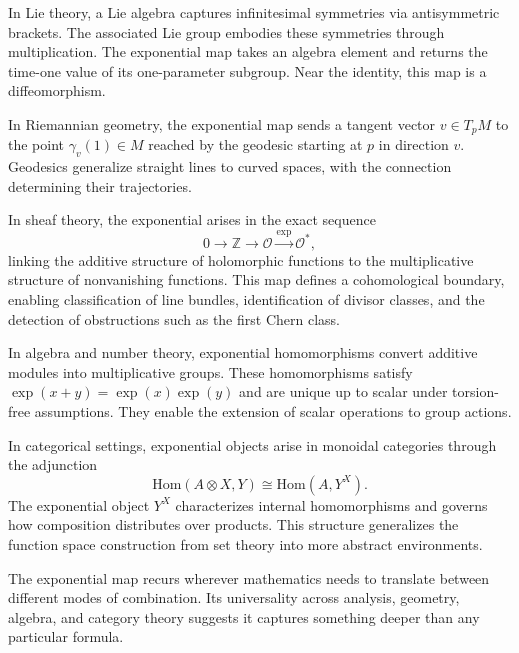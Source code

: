 In Lie theory, a Lie algebra captures infinitesimal symmetries via antisymmetric brackets. The associated Lie group embodies these symmetries through multiplication. The exponential map takes an algebra element and returns the time-one value of its one-parameter subgroup. Near the identity, this map is a diffeomorphism.

In Riemannian geometry, the exponential map sends a tangent vector \( v \in T_p M \) to the point \( \gamma_v(1) \in M \) reached by the geodesic starting at \( p \) in direction \( v \). Geodesics generalize straight lines to curved spaces, with the connection determining their trajectories.

In sheaf theory, the exponential arises in the exact sequence
\[
0 \to \mathbb{Z} \to \mathcal{O} \xrightarrow{\exp} \mathcal{O}^*,
\]
linking the additive structure of holomorphic functions to the multiplicative structure of nonvanishing functions. This map defines a cohomological boundary, enabling classification of line bundles, identification of divisor classes, and the detection of obstructions such as the first Chern class.

In algebra and number theory, exponential homomorphisms convert additive modules into multiplicative groups. These homomorphisms satisfy \( \exp(x + y) = \exp(x)\exp(y) \) and are unique up to scalar under torsion-free assumptions. They enable the extension of scalar operations to group actions.

In categorical settings, exponential objects arise in monoidal categories through the adjunction
\[
\mathrm{Hom}(A \otimes X, Y) \cong \mathrm{Hom}(A, Y^X).
\]
The exponential object \( Y^X \) characterizes internal homomorphisms and governs how composition distributes over products. This structure generalizes the function space construction from set theory into more abstract environments.

The exponential map recurs wherever mathematics needs to translate between different modes of combination. Its universality across analysis, geometry, algebra, and category theory suggests it captures something deeper than any particular formula.


